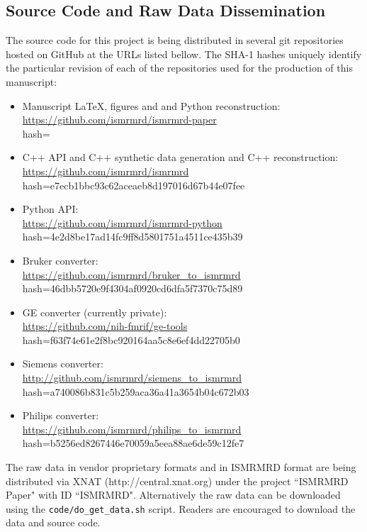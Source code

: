 \documentclass[12pt, draft]{article}
\newcommand{\mreplaced}[2][None]{\replaced[remark=#1]{#2}}
\begin{document}
\subsection*{Source Code and Raw Data Dissemination}
The source code for this project is being distributed in several git repositories hosted on GitHub at the URLs listed bellow.  The SHA-1 hashes uniquely identify the particular revision of each of the repositories used for the production of this manuscript:
\begin{itemize}
\item Manuscript LaTeX, figures and \mreplaced[R2.14]{MATLAB}{Matlab} and Python reconstruction: \\
	\url{https://github.com/ismrmrd/ismrmrd-paper} \\
	hash=\githash
\item C++ API and C++ synthetic data generation and C++ reconstruction: \\
	\url{https://github.com/ismrmrd/ismrmrd} \\
    	hash=e7ecb1bbc93c62aceaeb8d197016d67b44e07fee
\item Python API: \\
	\url{https://github.com/ismrmrd/ismrmrd-python} \\
	hash=4e2d8be17ad14fc9ff8d5801751a4511ce435b39
\item Bruker converter: \\
	\url{https://github.com/ismrmrd/bruker_to_ismrmrd}\\
	hash=46dbb5720e9f4304af0920cd6dfa5f7370c75d89
\item GE converter (currently private):\\
	 \url{https://github.com/nih-fmrif/ge-tools} \\
	 hash=f63f74e61e2f8bc920164aa5c8e6ef4dd22705b0
\item Siemens converter:\\
	 \url{http://github.com/ismrmrd/siemens_to_ismrmrd}\\
	 hash=a740086b831c5b259aca36a41a3654b04c672b03
\item Philips converter: \\
	\url{https://github.com/ismrmrd/philips_to_ismrmrd}\\
	hash=b5256ed8267446e70059a5eea88ae6de59c12fe7
\end{itemize}
The raw data in vendor proprietary formats and in ISMRMRD format are being distributed via XNAT (http://central.xnat.org) under the project ``ISMRMRD Paper" with ID ``ISMRMRD".  Alternatively the raw data can be downloaded using the \texttt{code/do\_get\_data.sh} script. Readers are encouraged to download the data and source code.
\end{document}
